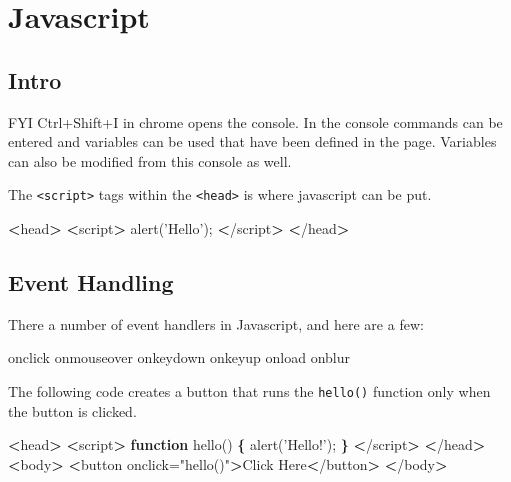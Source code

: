 \documentclass[]{book}
\newenvironment{Shaded}{\begin{snugshade}}{\end{snugshade}}
\newcommand{\KeywordTok}[1]{\textcolor[rgb]{0.13,0.29,0.53}{\textbf{#1}}}
\newcommand{\StringTok}[1]{\textcolor[rgb]{0.31,0.60,0.02}{#1}}
\newcommand{\FunctionTok}[1]{\textcolor[rgb]{0.00,0.00,0.00}{#1}}
\newcommand{\OperatorTok}[1]{\textcolor[rgb]{0.81,0.36,0.00}{\textbf{#1}}}
\newcommand{\ExtensionTok}[1]{#1}
\newcommand{\NormalTok}[1]{#1}
\begin{document}
\chapter{Javascript}\label{javascript}

\section{Intro}\label{intro-3}

FYI Ctrl+Shift+I in chrome opens the console. In the console commands
can be entered and variables can be used that have been defined in the
page. Variables can also be modified from this console as well.

The \texttt{\textless{}script\textgreater{}} tags within the
\texttt{\textless{}head\textgreater{}} is where javascript can be put.

\begin{Shaded}
\begin{Highlighting}[]
\OperatorTok{<}\FunctionTok{head}\OperatorTok{>}
    \OperatorTok{<}\ExtensionTok{script}\OperatorTok{>}
        \ExtensionTok{alert}\NormalTok{(}\StringTok{'Hello'}\NormalTok{);}
    \OperatorTok{<}\NormalTok{/}\ExtensionTok{script}\OperatorTok{>}
\OperatorTok{<}\NormalTok{/}\ExtensionTok{head}\OperatorTok{>}
\end{Highlighting}
\end{Shaded}

\section{Event Handling}\label{event-handling}

There a number of event handlers in Javascript, and here are a few:

\begin{Shaded}
\begin{Highlighting}[]
\ExtensionTok{onclick}
\ExtensionTok{onmouseover}
\ExtensionTok{onkeydown}
\ExtensionTok{onkeyup}
\ExtensionTok{onload}
\ExtensionTok{onblur}
\end{Highlighting}
\end{Shaded}

The following code creates a button that runs the \texttt{hello()}
function only when the button is clicked.

\begin{Shaded}
\begin{Highlighting}[]
\OperatorTok{<}\FunctionTok{head}\OperatorTok{>}
    \OperatorTok{<}\ExtensionTok{script}\OperatorTok{>}
        \KeywordTok{function}\FunctionTok{ hello()} \KeywordTok{\{}
            \ExtensionTok{alert}\NormalTok{(}\StringTok{'Hello!'}\NormalTok{);}
        \KeywordTok{\}}
    \OperatorTok{<}\NormalTok{/}\ExtensionTok{script}\OperatorTok{>}
\OperatorTok{<}\NormalTok{/}\ExtensionTok{head}\OperatorTok{>}
\OperatorTok{<}\ExtensionTok{body}\OperatorTok{>}
    \OperatorTok{<}\ExtensionTok{button}\NormalTok{ onclick=}\StringTok{"hello()"}\OperatorTok{>}\NormalTok{Click Here}\OperatorTok{<}\NormalTok{/button}\OperatorTok{>}
\OperatorTok{<}\NormalTok{/}\ExtensionTok{body}\OperatorTok{>}
\end{Highlighting}
\end{Shaded}
\end{document}
